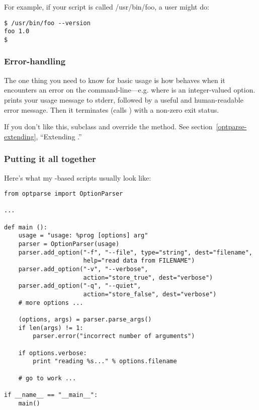 For example, if your script is called /usr/bin/foo, a user might do:

\begin{verbatim}
$ /usr/bin/foo --version
foo 1.0
$
\end{verbatim}

\subsubsection{Error-handling\label{optparse-error-handling}}

The one thing you need to know for basic usage is how
 behaves when it encounters an error on the
command-line---e.g.  where  is an
integer-valued option.   prints your usage message to
stderr, followed by a useful and human-readable error message.  Then
it terminates (calls ) with a non-zero exit
status.

If you don't like this, subclass  and override the
 method.  See section~\ref{optparse-extending},
``Extending .''

\subsubsection{Putting it all together\label{optparse-basic-summary}}

Here's what my -based scripts usually look like:

\begin{verbatim}
from optparse import OptionParser

...

def main ():
    usage = "usage: %prog [options] arg"
    parser = OptionParser(usage)
    parser.add_option("-f", "--file", type="string", dest="filename",
                      help="read data from FILENAME")
    parser.add_option("-v", "--verbose",
                      action="store_true", dest="verbose")
    parser.add_option("-q", "--quiet",
                      action="store_false", dest="verbose")
    # more options ...

    (options, args) = parser.parse_args()
    if len(args) != 1:
        parser.error("incorrect number of arguments")

    if options.verbose:
        print "reading %s..." % options.filename

    # go to work ...

if __name__ == "__main__":
    main()
\end{verbatim}

